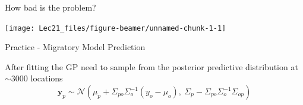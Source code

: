 \documentclass[11pt,ignorenonframetext,]{beamer}
\begin{document}
\begin{frame}{How bad is the problem?}
\protect\hypertarget{how-bad-is-the-problem}{}

\begin{center}\texttt{[image: Lec21\_files/figure-beamer/unnamed-chunk-1-1]} \end{center}

\end{frame}

\begin{frame}{Practice - Migratory Model Prediction}
\protect\hypertarget{practice---migratory-model-prediction}{}

After fitting the GP need to sample from the posterior predictive
distribution at \(\sim3000\) locations
\[ \symbf{y}_{p} \sim \mathcal{N}\left(\mu_p + \Sigma_{po} \Sigma_o^{-1}(y_o - \mu_o) ,~ \Sigma_p - \Sigma_{po} \Sigma_{o}^{-1} \Sigma_{op}\right) \]

\pause

\scriptsize


\end{frame}
\end{document}
